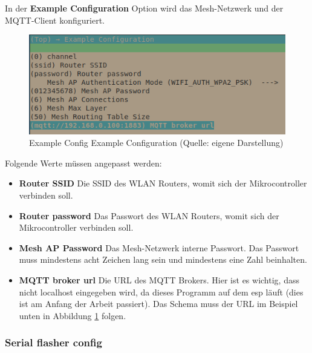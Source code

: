 In der \textbf{Example Configuration} Option wird das Mesh-Netzwerk und der MQTT-Client konfiguriert.

\begin{figure}[H]
    \begin{center}
        \includegraphics[scale=1]{images/example_config_example_config.png}
        \caption{Example Config Example Configuration (Quelle: eigene Darstellung)}
        \label{abb:example_config_example_config}
    \end{center}
\end{figure}

Folgende Werte müssen angepasst werden:

\begin{itemize}
    \item \textbf{Router SSID} \newline
        Die SSID des WLAN Routers, womit sich der Mikrocontroller verbinden soll.
    \item \textbf{Router password} \newline
        Das Passwort des WLAN Routers, womit sich der Mikrocontroller verbinden soll.
    \item \textbf{Mesh AP Password} \newline
        Das Mesh-Netzwerk interne Passwort. Das Passwort muss mindestens acht Zeichen lang sein und mindestens eine Zahl beinhalten.
    \item \textbf{MQTT broker url} \newline
        Die URL des MQTT Brokers. Hier ist es wichtig, dass nicht localhost eingegeben wird, da dieses Programm auf dem esp läuft (dies ist am Anfang der Arbeit passiert).\newline
        Das Schema muss der URL im Beispiel unten in Abbildung \ref{abb:example_config_example_config} folgen.
\end{itemize}

\pagebreak

\subsubsection{Serial flasher config}\label{sec:example-serial-flasher-config}

